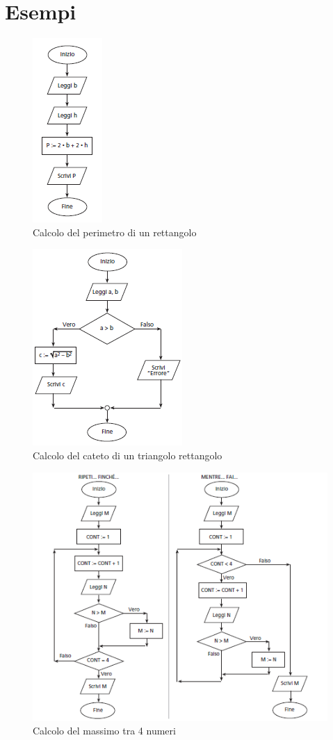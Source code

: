 \documentclass{article}
\begin{document}
	\pagebreak
	
	\section{Esempi}
	\begin{figure}[h!]
		\centering
		\includegraphics[scale=1]{Perimetro.png}
		\caption{Calcolo del perimetro di un rettangolo}
	\end{figure}
	\begin{figure}[h!]
		\centering
		\includegraphics[scale=1]{Cateto.png}
		\caption{Calcolo del cateto di un triangolo rettangolo}
	\end{figure}
	\begin{figure}[h!]
		\centering
		\includegraphics[scale=1]{Massimo4Numeri.png}
		\caption{Calcolo del massimo tra 4 numeri}
	\end{figure}
\end{document}
